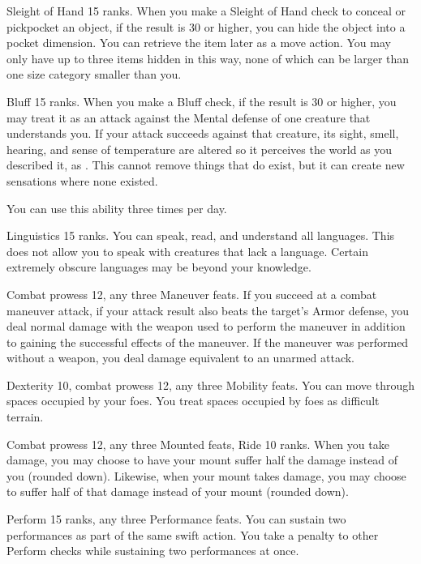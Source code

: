 \featpre Sleight of Hand 15 ranks.
\featben When you make a Sleight of Hand check to conceal or pickpocket an object, if the result is 30 or higher, you can hide the object into a pocket dimension.
You can retrieve the item later as a move action.
You may only have up to three items hidden in this way, none of which can be larger than one size category smaller than you.

\featpre Bluff 15 ranks.
\featben When you make a Bluff check, if the result is 30 or higher, you may treat it as an attack against the Mental defense of one creature that understands you.
If your attack succeeds against that creature, its sight, smell, hearing, and sense of temperature are altered so it perceives the world as you described it, as .
This cannot remove things that do exist, but it can create new sensations where none existed.

You can use this ability three times per day.

\featpre Linguistics 15 ranks.
\featben You can speak, read, and understand all languages.
This does not allow you to speak with creatures that lack a language.
Certain extremely obscure languages may be beyond your knowledge.

\featpres Combat prowess 12, any three Maneuver feats.
\featben If you succeed at a combat maneuver attack, if your attack result also beats the target's Armor defense, you deal normal damage with the weapon used to perform the maneuver in addition to gaining the successful effects of the maneuver.
If the maneuver was performed without a weapon, you deal damage equivalent to an unarmed attack.

\featpres Dexterity 10, combat prowess 12, any three Mobility feats.
\featben You can move through spaces occupied by your foes.
You treat spaces occupied by foes as difficult terrain.

\featpres Combat prowess 12, any three Mounted feats, Ride 10 ranks.
\featben When you take damage, you may choose to have your mount suffer half the damage instead of you (rounded down).
Likewise, when your mount takes damage, you may choose to suffer half of that damage instead of your mount (rounded down).

\featpres Perform 15 ranks, any three Performance feats.
\featben You can sustain two performances as part of the same swift action.
You take a  penalty to other Perform checks while sustaining two performances at once.

